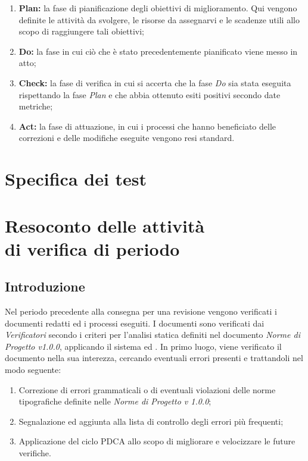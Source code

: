 \documentclass[openany,12pt,a4paper]{report}
\begin{document}
\begin{enumerate}
    \item \textbf{Plan:} la fase di pianificazione degli obiettivi di miglioramento. Qui vengono definite le attività da svolgere, le risorse da assegnarvi e le scadenze utili allo scopo di raggiungere tali obiettivi;
    \item \textbf{Do:} la fase in cui ciò che è stato precedentemente pianificato viene messo in atto;
    \item \textbf{Check:} la fase di verifica in cui si accerta che la fase \textit{Do} sia stata eseguita rispettando la fase \textit{Plan} e che abbia ottenuto esiti positivi secondo date metriche;
    \item \textbf{Act:} la fase di attuazione, in cui i processi che hanno beneficiato delle correzioni e delle modifiche eseguite vengono resi standard.
\end{enumerate}


\chapter{Specifica dei test}


\chapter{Resoconto delle attività \\ di verifica di periodo}

\section{Introduzione}

Nel periodo precedente alla consegna per una revisione vengono verificati i documenti redatti ed i processi eseguiti. I documenti sono verificati dai \textit{Verificatori} secondo i criteri per l'analisi statica definiti nel documento \textit{Norme di Progetto v1.0.0}, applicando il sistema  ed . In primo luogo, viene verificato il documento nella sua interezza, cercando eventuali errori presenti e trattandoli nel modo seguente:

\begin{enumerate}
	\item Correzione di errori grammaticali o di eventuali violazioni delle norme tipografiche definite nelle \textit{Norme di Progetto v 1.0.0};
	\item  Segnalazione ed aggiunta alla lista di controllo degli errori più frequenti;
	\item Applicazione del ciclo PDCA allo scopo di migliorare e velocizzare le future verifiche.
\end{enumerate}
\end{document}
